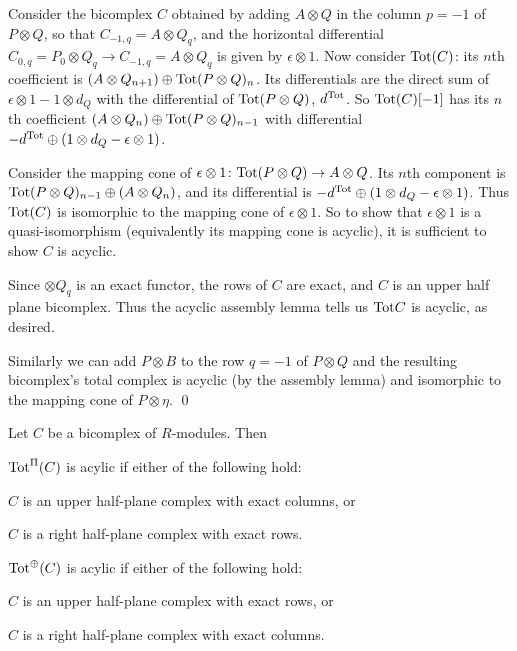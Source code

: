     Consider the bicomplex $C$ obtained by adding $A\otimes Q$ in the column $p=-1$ of $P\otimes Q$, so that $C_{-1,q}=A\otimes Q_q$, and the horizontal differential
    $C_{0,q}=P_0\otimes Q_q\to C_{-1,q}=A\otimes Q_q$ is given by $\epsilon\otimes1$.
    Now consider ${\rm Tot}(C)$: its $n$th coefficient is $(A\otimes Q_{n+1})\oplus{\rm Tot}(P\otimes Q)_n$.
    Its differentials are the direct sum of $\epsilon\otimes1-1\otimes d_Q$ with the differential of ${\rm Tot}(P\otimes Q)$, $d^{\rm Tot}$.
    So ${\rm Tot}(C)[-1]$ has its $n$th coefficient $(A\otimes Q_n)\oplus{\rm Tot}(P\otimes Q)_{n-1}$ with differential $-d^{\rm Tot}\oplus(1\otimes d_Q-\epsilon\otimes1)$.

    Consider the mapping cone of $\epsilon\otimes1\colon{\rm Tot}(P\otimes Q)\to A\otimes Q$.
    Its $n$th component is ${\rm Tot}(P\otimes Q)_{n-1}\oplus(A\otimes Q_n)$, and its differential is $-d^{\rm Tot}\oplus(1\otimes d_Q-\epsilon\otimes1)$.
    Thus ${\rm Tot}(C)$ is isomorphic to the mapping cone of $\epsilon\otimes1$.
    So to show that $\epsilon\otimes1$ is a quasi-isomorphism (equivalently its mapping cone is acyclic), it is sufficient to show $C$ is acyclic.

    Since $\otimes Q_q$ is an exact functor, the rows of $C$ are exact, and $C$ is an upper half plane bicomplex.
    Thus the acyclic assembly lemma tells us ${\rm Tot} C$ is acyclic, as desired.

    Similarly we can add $P\otimes B$ to the row $q=-1$ of $P\otimes Q$ and the resulting bicomplex's total complex is acyclic (by the assembly lemma) and isomorphic
    to the mapping cone of $P\otimes\eta$.
    \qed

\eproof

\blemm[title=Acyclic assembly lemma]

    Let $C$ be a bicomplex of $R$-modules.
    Then
    \benum
        \item ${\rm Tot}^\Pi(C)$ is acylic if either of the following hold:
        \benum
            \item $C$ is an upper half-plane complex with exact columns, or
            \item $C$ is a right half-plane complex with exact rows.
        \eenum
        \item ${\rm Tot}^\oplus(C)$ is acylic if either of the following hold:
        \benum
            \item $C$ is an upper half-plane complex with exact rows, or
            \item $C$ is a right half-plane complex with exact columns.
        \eenum
    \eenum

